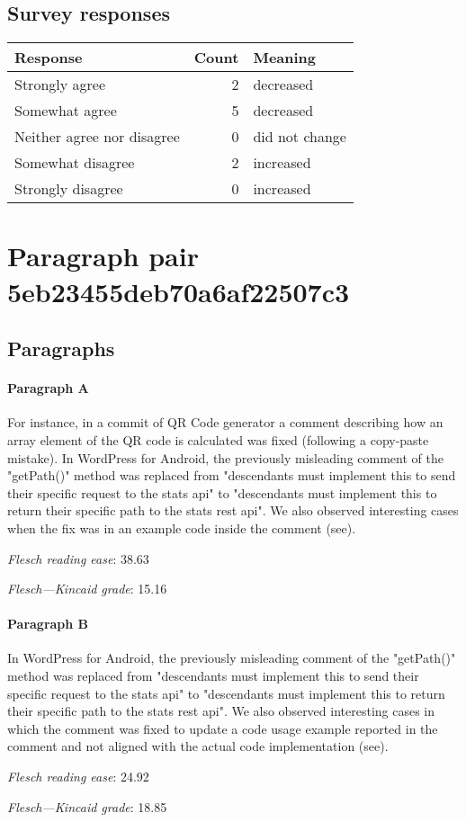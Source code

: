 \subsection{Survey responses}
\begin{tabular}{lrl}
\toprule
          \textbf{Response} &  \textbf{Count} & \textbf{Meaning} \\
\midrule
             Strongly agree &               2 &        decreased \\
             Somewhat agree &               5 &        decreased \\
 Neither agree nor disagree &               0 &   did not change \\
          Somewhat disagree &               2 &        increased \\
          Strongly disagree &               0 &        increased \\
\bottomrule
\end{tabular}

\section{Paragraph pair 5eb23455deb70a6af22507c3}
\subsection{Paragraphs}
\paragraph{Paragraph A}
For instance, in a commit of QR Code generator a comment describing how an array element of the QR code is calculated was fixed (following a copy-paste mistake). In WordPress for Android, the previously misleading comment of the "getPath()" method was replaced from "descendants must implement this to send their specific request to the stats api" to "descendants must implement this to return their specific path to the stats rest api". We also observed interesting cases when the fix was in an example code inside the comment (see).\par\medskip
\emph{Flesch reading ease}: 38.63\par
\emph{Flesch---Kincaid grade}: 15.16

\paragraph{Paragraph B}
In WordPress for Android, the previously misleading comment of the "getPath()" method was replaced from "descendants must implement this to send their specific request to the stats api" to "descendants must implement this to return their specific path to the stats rest api". We also observed interesting cases in which the comment was fixed to update a code usage example reported in the comment and not aligned with the actual code implementation (see).\par\medskip
\emph{Flesch reading ease}: 24.92\par
\emph{Flesch---Kincaid grade}: 18.85

